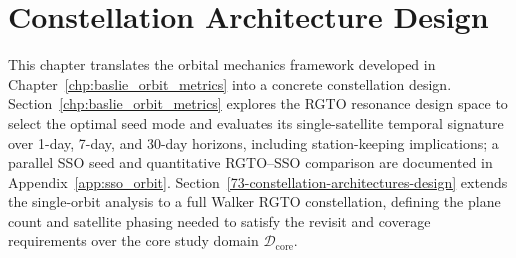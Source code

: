 
\chapter{Constellation Architecture Design
}\label{73-constellation-design-architectures}

This chapter translates the orbital mechanics framework developed in Chapter~\ref{chp:baslie_orbit_metrics} into a concrete constellation design.  Section~\ref{chp:baslie_orbit_metrics} explores the RGTO resonance design space to select the optimal seed mode and evaluates its single-satellite temporal signature over 1-day, 7-day, and 30-day horizons, including station-keeping implications; a parallel SSO seed and quantitative RGTO--SSO comparison are documented in Appendix~\ref{app:sso_orbit}.  Section~\ref{73-constellation-architectures-design} extends the single-orbit analysis to a full Walker RGTO constellation, defining the plane count and satellite phasing needed to satisfy the revisit and coverage requirements over the core study domain $\mathcal{D}_{\mathrm{core}}$.




